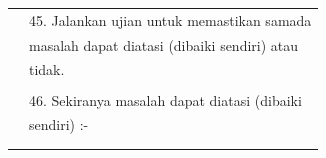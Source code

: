 \documentclass[
]{article}
\begin{document}
\begin{longtable}[]{@{}ll@{}}
\begin{minipage}[t]{0.23\columnwidth}\raggedright
\strut
\end{minipage} & \begin{minipage}[t]{0.71\columnwidth}\raggedright
45. Jalankan ujian untuk memastikan samada\strut
\end{minipage}\tabularnewline
\begin{minipage}[t]{0.23\columnwidth}\raggedright
\strut
\end{minipage} & \begin{minipage}[t]{0.71\columnwidth}\raggedright
masalah dapat diatasi (dibaiki sendiri) atau\strut
\end{minipage}\tabularnewline
\begin{minipage}[t]{0.23\columnwidth}\raggedright
\strut
\end{minipage} & \begin{minipage}[t]{0.71\columnwidth}\raggedright
tidak.\strut
\end{minipage}\tabularnewline
\begin{minipage}[t]{0.23\columnwidth}\raggedright
\strut
\end{minipage} & \begin{minipage}[t]{0.71\columnwidth}\raggedright
\strut
\end{minipage}\tabularnewline
\begin{minipage}[t]{0.23\columnwidth}\raggedright
\strut
\end{minipage} & \begin{minipage}[t]{0.71\columnwidth}\raggedright
46. Sekiranya masalah dapat diatasi (dibaiki\strut
\end{minipage}\tabularnewline
\begin{minipage}[t]{0.23\columnwidth}\raggedright
\strut
\end{minipage} & \begin{minipage}[t]{0.71\columnwidth}\raggedright
sendiri) :-\strut
\end{minipage}\tabularnewline
\begin{minipage}[t]{0.23\columnwidth}\raggedright
\strut
\end{minipage} & \begin{minipage}[t]{0.71\columnwidth}\raggedright
\strut
\end{minipage}\tabularnewline
\begin{minipage}[t]{0.23\columnwidth}\raggedright
\strut
\end{minipage} & \begin{minipage}[t]{0.71\columnwidth}\raggedright

\end{minipage}
\end{longtable}
\end{document}
